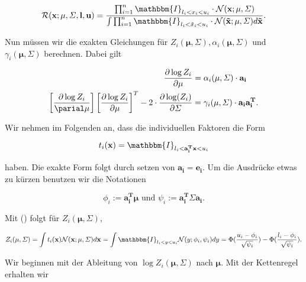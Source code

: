 \documentclass[12pt,a4paper]{scrartcl}
\numberwithin{equation}{section}
\begin{document}
\begin{equation}
 \mathcal{R}(\mathbf{x;\mu, \varSigma, l, u}) = \frac{ \prod_{i = 1}^n \mathbbm{I}_{l_i < x_i < u_i} \cdot \mathcal{N}(\mathbf{x;\mu,\varSigma})}{\int \prod_{i=1}^n \mathbbm{I}_{l_i< \tilde x_i < u_i } \cdot \mathcal{N}(\mathbf{\tilde x; \mu, \varSigma}) d \mathbf{\tilde x}}. 
\end{equation}

Nun müssen wir die exakten Gleichungen für $Z_i(\mathbf{\mu, \varSigma}), \alpha_i(\mathbf{\mu, \varSigma})$ und $\gamma_i(\mathbf{\mu,\varSigma})$ berechnen.
Dabei gilt

\begin{equation}
 \begin{split}
  \frac{\partial \log{Z_i}}{\partial \mathbf{\mu}} &= \alpha_i(\mathbf{\mu, \varSigma}) \cdot \mathbf{a_i} \\
  \left [ \frac{\partial \log{Z_i} }{\parial \mathbf{\mu}} \right ] \left [ \frac{\partial \log{Z_i}}{\partial \mathbf{\mu}}\right ]^T - 2 \cdot \frac{\partial \log(Z_i)}{\partial \mathbf{\varSigma}} &= \gamma_i(\mathbf{\mu, \varSigma}) \cdot \mathbf{a_i a_i^T}.
 \end{split}
\end{equation}

Wir nehmen im Folgenden an, dass die individuellen Faktoren die Form 

\begin{equation}
 t_i(\mathbf{x}) = \mathbbm{I}_{l_i < \mathbf{a_i^T x} < u_i}
\end{equation}

haben. Die exakte Form folgt durch setzen von $\mathbf{a_i = e_i}$. Um die Ausdrücke etwas zu kürzen 
benutzen wir die Notationen 

\begin{equation}
 \phi_i := \mathbf{a_i^T \mu} \text{	und	} \psi_i := \mathbf{a_i^T \varSigma a_i}.
\end{equation}

Mit () folgt für $Z_i(\mathbf{\mu,\varSigma})$, 

\begin{equation}
 Z_i(\mathbf{\mu, \varSigma}) = \int t_i(\mathbf{x}) \mathcal{N}(\mathbf{x; \mu, \varSigma}) d \mathbf{x} = \int \mathbbm{I}_{l_i < y < u_i} \mathcal{N}(y; \phi_i, \psi_i) dy = \Phi(\frac{u_i - \phi_i}{\sqrt{\psi_i}}) - \Phi(\frac{l_i - \phi_i}{\sqrt{\psi_i}}).
\end{equation}

Wir beginnen mit der Ableitung von $\log Z_i(\mathbf{\mu, \varSigma})$ nach $\mathbf{\mu}$. Mit der Kettenregel erhalten wir
\end{document}
